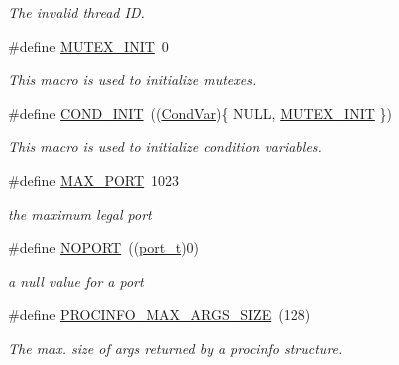 \begin{DoxyCompactItemize}
\begin{DoxyCompactList}\small\item\em The invalid thread I\-D. \end{DoxyCompactList}\item 
\#define \hyperlink{group__syscalls_ga96be0bfc33e7e113099c7546798bec99}{M\-U\-T\-E\-X\-\_\-\-I\-N\-I\-T}~0
\begin{DoxyCompactList}\small\item\em This macro is used to initialize mutexes. \end{DoxyCompactList}\item 
\#define \hyperlink{group__syscalls_ga6a7055a466bff255172e05f6ec82d792}{C\-O\-N\-D\-\_\-\-I\-N\-I\-T}~((\hyperlink{structCondVar}{Cond\-Var})\{ N\-U\-L\-L, \hyperlink{group__syscalls_ga96be0bfc33e7e113099c7546798bec99}{M\-U\-T\-E\-X\-\_\-\-I\-N\-I\-T} \})
\begin{DoxyCompactList}\small\item\em This macro is used to initialize condition variables. \end{DoxyCompactList}\item 
\hypertarget{group__syscalls_ga401e1a60d6381236216b6a130a6685bd}{\#define \hyperlink{group__syscalls_ga401e1a60d6381236216b6a130a6685bd}{M\-A\-X\-\_\-\-P\-O\-R\-T}~1023}\label{group__syscalls_ga401e1a60d6381236216b6a130a6685bd}

\begin{DoxyCompactList}\small\item\em the maximum legal port \end{DoxyCompactList}\item 
\hypertarget{group__syscalls_gab71912b8841547d43a65ad40d730acd5}{\#define \hyperlink{group__syscalls_gab71912b8841547d43a65ad40d730acd5}{N\-O\-P\-O\-R\-T}~((\hyperlink{group__syscalls_ga13894e5a2ffd5febb7aeb90e87239d61}{port\-\_\-t})0)}\label{group__syscalls_gab71912b8841547d43a65ad40d730acd5}

\begin{DoxyCompactList}\small\item\em a null value for a port \end{DoxyCompactList}\item 
\hypertarget{group__syscalls_ga657ad9e9d81dcca25fb225cf99051e0d}{\#define \hyperlink{group__syscalls_ga657ad9e9d81dcca25fb225cf99051e0d}{P\-R\-O\-C\-I\-N\-F\-O\-\_\-\-M\-A\-X\-\_\-\-A\-R\-G\-S\-\_\-\-S\-I\-Z\-E}~(128)}\label{group__syscalls_ga657ad9e9d81dcca25fb225cf99051e0d}

\begin{DoxyCompactList}\small\item\em The max. size of args returned by a procinfo structure. \end{DoxyCompactList}\end{DoxyCompactItemize}
